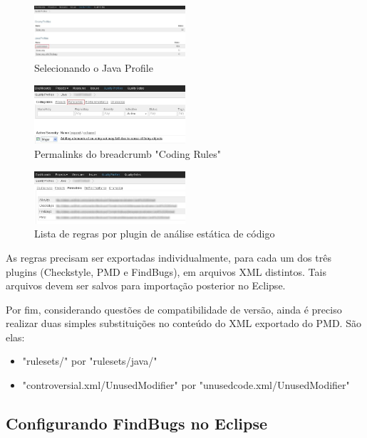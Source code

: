\documentclass[12pt,journal,compsoc]{IEEEtran}
\begin{document}
\begin{figure}[ht!]
\centering
\includegraphics[width=0.5\textwidth]{img/sonar-step-02}
\caption{Selecionando o Java Profile}
\label{sonar-step-02}
\end{figure} 

\begin{figure}[ht!]
\centering
\includegraphics[width=0.5\textwidth]{img/sonar-step-03}
\caption{Permalinks do breadcrumb "Coding Rules"}
\label{sonar-step-03}
\end{figure} 

\begin{figure}[ht!]
\centering
\includegraphics[width=0.5\textwidth]{img/sonar-step-04}
\caption{Lista de regras por plugin de análise estática de código}
\label{sonar-step-04}
\end{figure} 

As regras precisam ser exportadas individualmente, para cada um dos três plugins (Checkstyle, PMD e FindBugs), em arquivos XML distintos. Tais arquivos devem ser salvos para importação posterior no Eclipse.

Por fim, considerando questões de compatibilidade de versão, ainda é preciso realizar duas simples substituições no conteúdo do XML exportado do PMD. São elas:

\begin{itemize}
\item "rulesets/" por "rulesets/java/"
\item "controversial.xml/UnusedModifier" por "unusedcode.xml/UnusedModifier"
\end{itemize}


\subsection{Configurando FindBugs no Eclipse}
\end{document}
